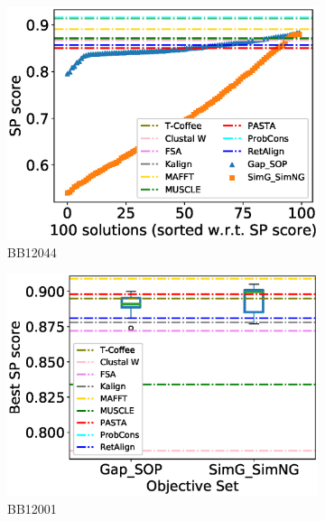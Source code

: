 \begin{figure}[!htbp]
\begin{adjustwidth}{-1.5cm}{-1cm}
\begin{subfigure}{0.22\textwidth}
			\includegraphics[width=\columnwidth]{Figure/summary/precomputedInit/Balibase/BB12044_pairs_density_single_run_2}
			\caption{BB12044}
		\end{subfigure}
		\begin{subfigure}{0.22\textwidth}
			\includegraphics[width=\columnwidth]{Figure/summary/precomputedInit/Balibase/BB12001_objset_pairs_rank_2}
			\caption{BB12001}
		\end{subfigure}	
		\begin{subfigure}{0.22\textwidth}

\end{subfigure}
\end{adjustwidth}
\end{figure}
